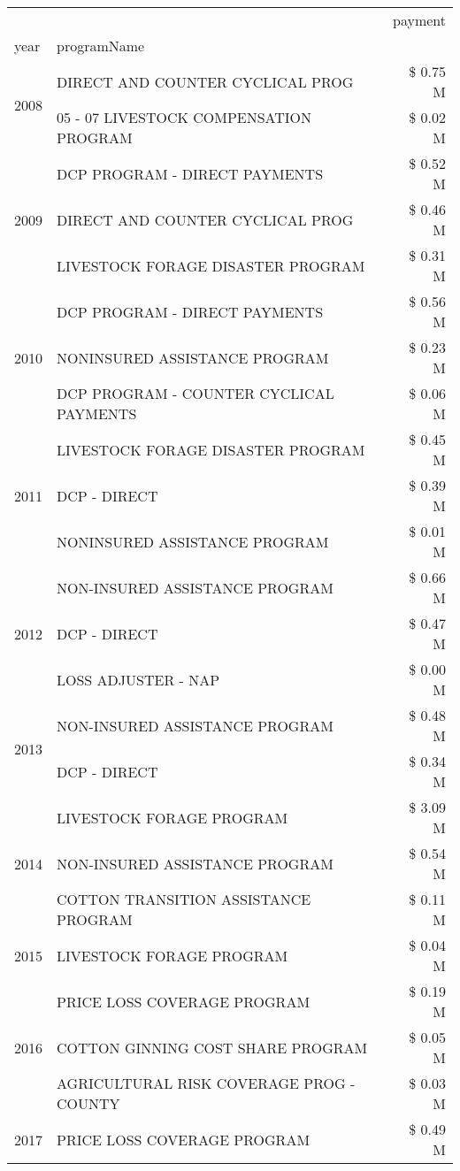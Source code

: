 \begin{tabular}{llr}
\toprule
 &  & payment \\
year & programName &  \\
\midrule
\multirow[t]{2}{*}{2008} & DIRECT AND COUNTER CYCLICAL PROG & \$ 0.75 M \\
 & 05 - 07 LIVESTOCK COMPENSATION PROGRAM & \$ 0.02 M \\
\cline{1-3}
\multirow[t]{3}{*}{2009} & DCP PROGRAM - DIRECT PAYMENTS & \$ 0.52 M \\
 & DIRECT AND COUNTER CYCLICAL PROG & \$ 0.46 M \\
 & LIVESTOCK FORAGE DISASTER  PROGRAM & \$ 0.31 M \\
\cline{1-3}
\multirow[t]{3}{*}{2010} & DCP PROGRAM - DIRECT PAYMENTS & \$ 0.56 M \\
 & NONINSURED ASSISTANCE PROGRAM & \$ 0.23 M \\
 & DCP PROGRAM - COUNTER CYCLICAL PAYMENTS & \$ 0.06 M \\
\cline{1-3}
\multirow[t]{3}{*}{2011} & LIVESTOCK FORAGE DISASTER PROGRAM & \$ 0.45 M \\
 & DCP - DIRECT & \$ 0.39 M \\
 & NONINSURED ASSISTANCE PROGRAM & \$ 0.01 M \\
\cline{1-3}
\multirow[t]{3}{*}{2012} & NON-INSURED ASSISTANCE PROGRAM & \$ 0.66 M \\
 & DCP - DIRECT & \$ 0.47 M \\
 & LOSS ADJUSTER - NAP & \$ 0.00 M \\
\cline{1-3}
\multirow[t]{2}{*}{2013} & NON-INSURED ASSISTANCE PROGRAM & \$ 0.48 M \\
 & DCP - DIRECT & \$ 0.34 M \\
\cline{1-3}
\multirow[t]{3}{*}{2014} & LIVESTOCK FORAGE PROGRAM & \$ 3.09 M \\
 & NON-INSURED ASSISTANCE PROGRAM & \$ 0.54 M \\
 & COTTON TRANSITION ASSISTANCE PROGRAM & \$ 0.11 M \\
\cline{1-3}
2015 & LIVESTOCK FORAGE PROGRAM & \$ 0.04 M \\
\cline{1-3}
\multirow[t]{3}{*}{2016} & PRICE LOSS COVERAGE PROGRAM & \$ 0.19 M \\
 & COTTON GINNING COST SHARE PROGRAM & \$ 0.05 M \\
 & AGRICULTURAL RISK COVERAGE PROG - COUNTY & \$ 0.03 M \\
\cline{1-3}
\multirow[t]{3}{*}{2017} & PRICE LOSS COVERAGE PROGRAM & \$ 0.49 M \\

\end{tabular}
